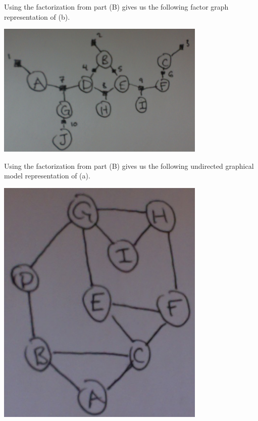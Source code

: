 \documentclass[solution, letterpaper]{cs121}
\begin{document}
\begin{empfile}
Using the factorization from part (B) gives us the following factor graph representation of (b).
\begin{center}
\includegraphics[width=100mm]{factor_graph_b.png}
\end{center}

\pagebreak

\subproblem %
Using the factorization from part (B) gives us the following undirected graphical model representation of (a).
\begin{center}
\includegraphics[width=100mm]{undirected_graph_a.png}
\end{center}


\end{empfile}
\end{document}
